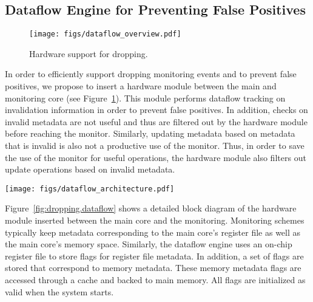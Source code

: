 \subsection{Dataflow Engine for Preventing False Positives}
\label{sec:dropping.arch}

\begin{figure}
  \begin{center}
    \texttt{[image: figs/dataflow\_overview.pdf]}
    \caption{Hardware support for dropping.}
    \label{fig:dropping.dataflow_overview}
    \vspace{-0.1in}
  \end{center}
\end{figure}

In order to efficiently support dropping monitoring events and to prevent false
positives, we propose to insert a hardware module between the main and
monitoring core (see Figure~\ref{fig:dropping.dataflow_overview}). 
This module performs dataflow tracking on invalidation information in
order to prevent false positives. In addition, checks on invalid metadata are not useful and
thus are filtered out by the hardware module before reaching the monitor.
Similarly, updating metadata based on metadata that is invalid is also not a
productive use of the monitor. Thus, in order to save the use of the monitor
for useful operations, the hardware module also filters out update operations
based on invalid metadata.

\begin{figure*}
  \begin{center}
    \texttt{[image: figs/dataflow\_architecture.pdf]}
    \vspace{-0.2in}
    \caption{Hardware architecture of the dataflow engine.}
    \label{fig:dropping.dataflow} 
    \vspace{-0.1in}
  \end{center}
\end{figure*}

Figure~\ref{fig:dropping.dataflow} shows a detailed block diagram of the
hardware module inserted between the main core and the monitoring. 
Monitoring schemes typically keep metadata corresponding to the main core's
register file as well as the main core's memory space. Similarly, the dataflow
engine uses an on-chip register file to store flags for register file metadata.
In addition, a set of flags are stored that correspond to memory metadata.
These memory metadata flags are accessed through a cache and backed to main
memory. All flags are initialized as valid when the system starts. 

